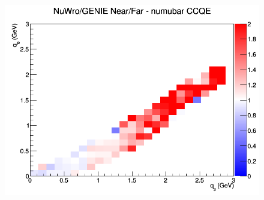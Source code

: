 \begin{figure}[h]
\endminipage
{}
\includegraphics[width=\linewidth]{q0_q3/nominal/ratios/CCQE_NuWro_GENIE_numubar_NF_q3_q0.png}
\endminipage
\newline
\end{figure}
\clearpage

